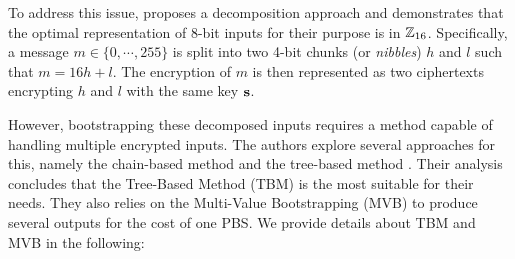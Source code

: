 To address this issue, \cite{DBLP:conf/wahc/TramaCBS23} proposes a decomposition approach and demonstrates that the optimal representation of 8-bit inputs for their purpose is in $\mathbb{Z}_{16}$. Specifically, a message $m \in \{0, \cdots, 255\}$ is split into two 4-bit chunks (or \emph{nibbles}) $h$ and $l$ such that $m = 16h+l$. The encryption of $m$ is then represented as two ciphertexts encrypting $h$ and $l$ with the same key $\mathbf s$.

However, bootstrapping these decomposed inputs requires a method capable of handling multiple encrypted inputs. The authors explore several approaches for this, namely the chain-based method and the tree-based method \cite{TCHES:GuiBorAra21}. Their analysis concludes that the Tree-Based Method (TBM) is the most suitable for their needs. They also relies on the Multi-Value Bootstrapping (MVB) to produce several outputs for the cost of one PBS. We provide details about TBM and MVB in the following:

